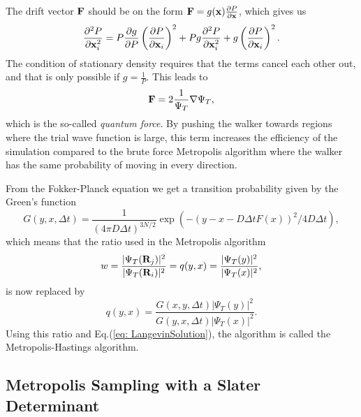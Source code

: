 \documentclass[../main.tex]{subfiles}
\begin{document}
The drift vector $\bf{F}$ should be on the form ${\bf F} = g({\bf x}) \frac{\partial P}{\partial {\bf x}}$, which gives us
\begin{equation}\label{stationaryFokkerF}
 \frac{\partial^2 P}{\partial {\bf x}_i^2} = P \frac{\partial g}{\partial P} \left(\frac{\partial P}{\partial {\bf x}_i}\right)^2 + Pg\frac{\partial^2 P}{\partial {\bf x}_i^2}
 + g\left(\frac{\partial P}{\partial {\bf x}_i}\right)^2.
\end{equation}
The condition of stationary density requires that the terms cancel each other out, and that is only possible if $g = \frac{1}{P}$. This leads to
\begin{equation}
 {\bf F} = 2 \frac{1}{\Psi_T} \nabla \Psi_T,
\end{equation}
which is the so-called \textit{quantum force}. By pushing the walker towards regions where the trial wave function is large, this term increases the efficiency of the simulation compared to the brute force Metropolis algorithm where the walker has the same probability of moving in every direction.

From the Fokker-Planck equation we get a transition probability given by the Green's function
\begin{equation}
    G(y, x, \Delta t) = \frac{1}{(4\pi D\Delta t)^{3N/2}}\exp(-(y - x - D\Delta tF(x))^2/4D\Delta t),
\end{equation}
which means that the ratio used in the Metropolis algorithm
\begin{equation}\label{ratio3}
 w = \frac{|\Psi_T({\bf R}_j)|^2}{|\Psi_T({\bf R}_i)|^2} = q(y, x) = \frac{|\Psi_T(y)|^2}{|\Psi_T(x)|^2},
\end{equation}
is now replaced by
\begin{equation}\label{ratio4}
    q(y, x) = \frac{G(x, y, \Delta t)|\Psi_T(y)|^2}{G(y, x, \Delta t)|\Psi_T(x)|^2}.
\end{equation}
Using this ratio and Eq.(\ref{eq: LangevinSolution}), the algorithm is called the Metropolis-Hastings algorithm.


\subsection{Metropolis Sampling with a Slater Determinant}
\end{document}
